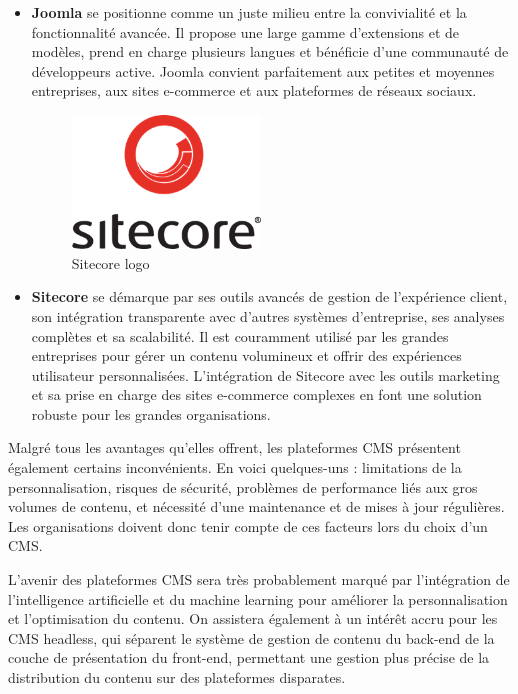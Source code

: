 \begin{itemize}
    \item \textbf{Joomla} se positionne comme un juste milieu entre la convivialité et la fonctionnalité avancée. Il propose une large gamme d'extensions et de modèles, prend en charge plusieurs langues et bénéficie d'une communauté de développeurs active. Joomla convient parfaitement aux petites et moyennes entreprises, aux sites e-commerce et aux plateformes de réseaux sociaux.

          \begin{figure}[H]
              \centering
              \includegraphics[width=5cm]{Figures/Sitecore.png}
              \caption{Sitecore logo }
          \end{figure}


    \item \textbf{Sitecore} se démarque par ses outils avancés de gestion de l'expérience client, son intégration transparente avec d'autres systèmes d'entreprise, ses analyses complètes et sa scalabilité. Il est couramment utilisé par les grandes entreprises pour gérer un contenu volumineux et offrir des expériences utilisateur personnalisées. L'intégration de Sitecore avec les outils marketing et sa prise en charge des sites e-commerce complexes en font une solution robuste pour les grandes organisations.

\end{itemize}
\hspace{\parindent}Malgré tous les avantages qu'elles offrent, les plateformes CMS présentent également certains inconvénients. En voici quelques-uns : limitations de la personnalisation, risques de sécurité, problèmes de performance liés aux gros volumes de contenu, et nécessité d'une maintenance et de mises à jour régulières. Les organisations doivent donc tenir compte de ces facteurs lors du choix d'un CMS.

L'avenir des plateformes CMS sera très probablement marqué par l'intégration de l'intelligence artificielle et du machine learning pour améliorer la personnalisation et l'optimisation du contenu. On assistera également à un intérêt accru pour les CMS headless, qui séparent le système de gestion de contenu du back-end de la couche de présentation du front-end, permettant une gestion plus précise de la distribution du contenu sur des plateformes disparates.

